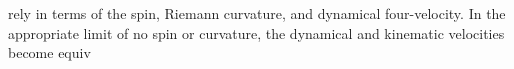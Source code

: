 rely in terms of the spin, Riemann curvature, and dynamical four-velocity. In the appropriate limit of no spin or curvature, the dynamical and kinematic velocities become equiv